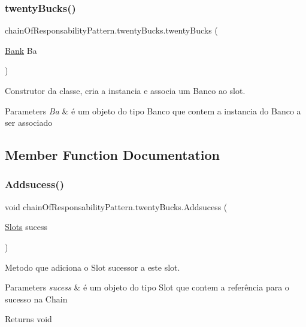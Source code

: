 \subsubsection{\texorpdfstring{twentyBucks()}{twentyBucks()}}
{\footnotesize\ttfamily chain\+Of\+Responsability\+Pattern.\+twenty\+Bucks.\+twenty\+Bucks (\begin{DoxyParamCaption}\item[{\mbox{\hyperlink{classmediator_pattern_1_1_bank}{Bank}}}]{Ba }\end{DoxyParamCaption})}



Construtor da classe, cria a instancia e associa um Banco ao slot. 


\begin{DoxyParams}{Parameters}
{\em Ba} & é um objeto do tipo Banco que contem a instancia do Banco a ser associado \\
\hline
\end{DoxyParams}


\subsection{Member Function Documentation}
\mbox{\label{classchain_of_responsability_pattern_1_1twenty_bucks_a70ca8917e318c74341ab19774dd265b3}} 
\subsubsection{\texorpdfstring{Addsucess()}{Addsucess()}}
{\footnotesize\ttfamily void chain\+Of\+Responsability\+Pattern.\+twenty\+Bucks.\+Addsucess (\begin{DoxyParamCaption}\item[{\mbox{\hyperlink{interfacechain_of_responsability_pattern_1_1_slots}{Slots}}}]{sucess }\end{DoxyParamCaption})}



Metodo que adiciona o Slot sucessor a este slot. 


\begin{DoxyParams}{Parameters}
{\em sucess} & é um objeto do tipo Slot que contem a referência para o sucesso na Chain \\
\hline
\end{DoxyParams}
\begin{DoxyReturn}{Returns}
void 
\end{DoxyReturn}
\mbox{\label{classchain_of_responsability_pattern_1_1twenty_bucks_aa8536487b98149e0c022258bb255a3b1}} 
